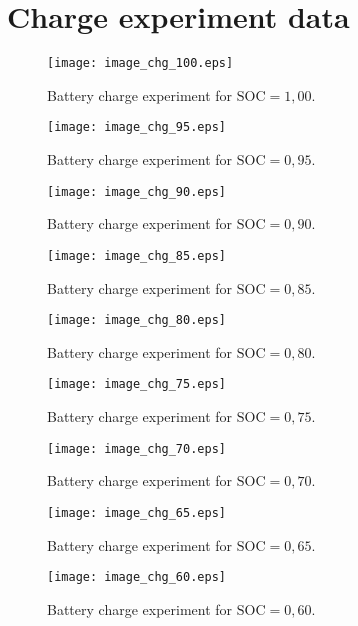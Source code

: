 \clearpage
\section{Charge experiment data}
\vfill%
\begin{figure}[h!]
	\centering
  	\texttt{[image: image\_chg\_100.eps]}
	\caption{Battery charge experiment for $\mathrm{SOC} = 1,00$.}
	\label{fig:image_dis_100}
\end{figure}
\vfill%
\begin{figure}[h!]
	\centering
  	\texttt{[image: image\_chg\_95.eps]}
	\caption{Battery charge experiment for $\mathrm{SOC} = 0,95$.}
	\label{fig:image_dis_95}
\end{figure}
\vfill%
\begin{figure}[h!]
	\centering
  	\texttt{[image: image\_chg\_90.eps]}
	\caption{Battery charge experiment for $\mathrm{SOC} = 0,90$.}
	\label{fig:image_dis_90}
\end{figure}
\begin{figure}[h!]
	\centering
  	\texttt{[image: image\_chg\_85.eps]}
	\caption{Battery charge experiment for $\mathrm{SOC} = 0,85$.}
	\label{fig:image_dis_85}
\end{figure}
\begin{figure}[h!]
	\centering
  	\texttt{[image: image\_chg\_80.eps]}
	\caption{Battery charge experiment for $\mathrm{SOC} = 0,80$.}
	\label{fig:image_dis_80}
\end{figure}
\begin{figure}[h!]
	\centering
  	\texttt{[image: image\_chg\_75.eps]}
	\caption{Battery charge experiment for $\mathrm{SOC} = 0,75$.}
	\label{fig:image_dis_75}
\end{figure}
\begin{figure}[h!]
	\centering
  	\texttt{[image: image\_chg\_70.eps]}
	\caption{Battery charge experiment for $\mathrm{SOC} = 0,70$.}
	\label{fig:image_dis_70}
\end{figure}
\begin{figure}[h!]
	\centering
  	\texttt{[image: image\_chg\_65.eps]}
	\caption{Battery charge experiment for $\mathrm{SOC} = 0,65$.}
	\label{fig:image_dis_65}
\end{figure}
\begin{figure}[h!]
	\centering
  	\texttt{[image: image\_chg\_60.eps]}
	\caption{Battery charge experiment for $\mathrm{SOC} = 0,60$.}
	\label{fig:image_dis_60}
\end{figure}
